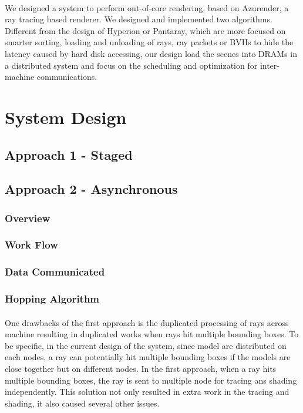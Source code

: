 \documentclass[a4paper, oneside, 10pt]{article}
\begin{document}
\paragraph{} We designed a system to perform out-of-core rendering, based on Azurender, a ray tracing based renderer. We designed and implemented two algorithms. Different from the design of Hyperion or Pantaray, which are more focused on smarter sorting, loading and unloading of rays, ray packets or BVHs to hide the latency caused by hard disk accessing, our design load the scenes into DRAMs in a distributed system and focus on the scheduling and optimization for inter-machine communications. 

\section{System Design}
\subsection{Approach 1 - Staged}
\subsection{Approach 2 - Asynchronous}
\subsubsection{Overview}
\subsubsection{Work Flow}
\subsubsection{Data Communicated}
\subsubsection{Hopping Algorithm}
\paragraph{} One drawbacks of the first approach is the duplicated processing of rays across machine resulting in duplicated works when rays hit multiple bounding boxes. To be specific, in the current design of the system, since model are distributed on each nodes, a ray can potentially hit multiple bounding boxes if the models are close together but on different nodes.  In the first approach, when a ray hits multiple bounding boxes, the ray is sent to multiple node for tracing ans shading independently. This solution not only resulted in extra work in the tracing and shading, it also caused several other issues.
\end{document}
